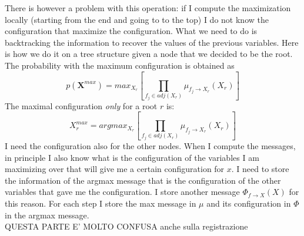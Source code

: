         There is however a problem with this operation: if I compute the maximization locally (starting from the end and going to to the top) I do not know the configuration that maximize the configuration. 
        What we need to do is backtracking the information to recover the values of the previous variables. Here is how we do it on a tree structure given a node that we decided to be the root.\\
        The probability with the maximum configuration is obtained as
        $$p(\textbf{X}^{max}) = max_{X_r} \left[ \prod_{f_j \in adj(X_r)} \mu_{f_j \rightarrow X_r}  (X_r) \right] $$
        The maximal configuration \textit{only} for a root $r$ is:
        $$X_r^{max} = argmax_{X_r} \left[ \prod_{f_j \in adj(X_r)}  \mu_{f_j \rightarrow X_r}  (X_r) \right] $$
        I need the configuration also for the other nodes. When I compute the messages, in principle I also know what is the configuration of the variables I am maximizing over that will give me a certain configuration for $x$. 
        I need to store the information of the argmax message that is the configuration of the other variables that gave me the configuration. I store another message $\Phi_{f\rightarrow X} (X)$ for this reason. For each step I store the max message in $\mu$ and its configuration in $\Phi$ in the argmax message. \\
        QUESTA PARTE E' MOLTO CONFUSA anche sulla registrazione
        

